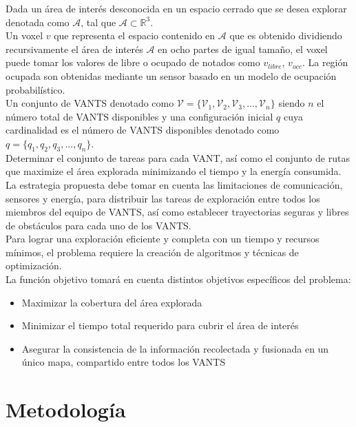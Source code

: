 \documentclass[sigconf]{acmart}
\begin{document}
Dada un área de interés desconocida en un espacio cerrado que se desea explorar denotada como $\mathcal{A}$, tal que $\mathcal{A} \subset \mathbb{R}^{3}$.\\

Un voxel $v$ que representa el espacio contenido en $\mathcal{A}$ que es obtenido dividiendo recursivamente el área de interés $\mathcal{A}$ en ocho partes de igual tamaño, el voxel puede tomar los valores de libre o ocupado de notados como $v_{libre}$, $v_{occ}$. La región ocupada son obtenidas mediante un sensor basado en un modelo de ocupación probabilístico.\\

Un conjunto de VANTS denotado como $\mathcal{V} = \{\mathcal{V}_{1},\mathcal{V}_{2},\mathcal{V}_{3},...,\mathcal{V}_{n}\}$ siendo $n$ el número total de VANTS disponibles y una configuración inicial $q$ cuya cardinalidad es el número de VANTS disponibles denotado como $q = \{q_{1},q_{2},q_{3},...,q_{n}\}$.\\

Determinar el conjunto de tareas para cada VANT, así como el conjunto de rutas que maximize el área explorada minimizando el tiempo y la energía consumida.\\

La estrategia propuesta debe tomar en cuenta las limitaciones de comunicación, sensores y energía, para distribuir las tareas de exploración entre todos los miembros del equipo de VANTS, así como establecer trayectorias seguras y libres de obstáculos para cada uno de los VANTS.\\

Para lograr una exploraci\'{o}n eficiente y completa con un tiempo y recursos m\'{i}nimos, el problema requiere la creaci\'{o}n de algoritmos y t\'{e}cnicas de optimizaci\'{o}n.\\

La funci\'{o}n objetivo tomar\'{a} en cuenta distintos objetivos espec\'{i}ficos del problema:
\begin{itemize}
\item Maximizar la cobertura del \'{a}rea explorada 
\item Minimizar el tiempo total requerido para cubrir el \'{a}rea de inter\'{e}s
\item Asegurar la consistencia de la información recolectada y fusionada en un único mapa, compartido entre todos los VANTS
\end{itemize}

\section{Metodología}
\end{document}
